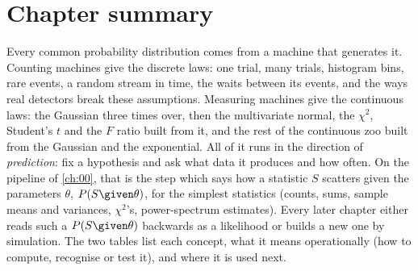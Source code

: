 \section*{Chapter summary}
\label{2b:sec:summary}

Every common probability distribution comes from a machine that generates it. Counting machines give the discrete laws: one trial, many trials, histogram bins, rare events, a random stream in time, the waits between its events, and the ways real detectors break these assumptions. Measuring machines give the continuous laws: the Gaussian three times over, then the multivariate normal, the $\chi^2$, Student's $t$ and the $F$ ratio built from it, and the rest of the continuous zoo built from the Gaussian and the exponential. All of it runs in the direction of \emph{prediction}: fix a hypothesis and ask what data it produces and how often. On the pipeline of \cref{ch:00}, that is the step which says how a statistic $S$ scatters given the parameters $\theta$, $P(S\given\theta)$, for the simplest statistics (counts, sums, sample means and variances, $\chi^2$'s, power-spectrum estimates). Every later chapter either reads such a $P(S\given\theta)$ backwards as a likelihood or builds a new one by simulation. The two tables list each concept, what it means operationally (how to compute, recognise or test it), and where it is used next.


